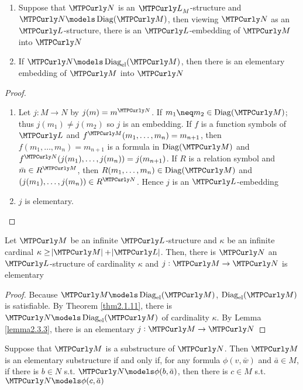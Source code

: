 \documentclass[11pt]{article}
\begin{document}
\begin{lemma}[]
\label{lemma2.3.3}
\begin{enumerate}
\item Suppose that \(\caln\) is an \(\call_M\)-structure and
\(\caln\models\Diag(\calm)\), then viewing \(\caln\) as an
\(\call\)-structure, there is an \(\call\)-embedding of \(\calm\) into \(\caln\)
\item If \(\caln\models\Diag_{\el}(\calm)\), then there is an elementary
embedding of \(\calm\) into \(\caln\)
\end{enumerate}
\end{lemma}

\begin{proof}
\begin{enumerate}
\item Let \(j:M\to N\) by \(j(m)=m^\caln\). If \(m_1\neq m_2\in\Diag(\calm)\);
thus \(j(m_1)\neq j(m_2)\) so \(j\) is an embedding. If \(f\) is a function
symbols of \(\call\) and \(f^\calm(m_1,\dots,m_n)=m_{n+1}\), then
\(f(m_1,\dots,m_n)=m_{n+1}\) is a formula in \(\Diag(\calm)\) and 
\(f^\caln(j(m_1),\dots,j(m_n))=j(m_{n+1})\). If \(R\) is a relation symbol
and \(\bar{m}\in R^\calm\), then \(R(m_1,\dots,m_n)\in\Diag(\calm)\) and 
\((j(m_1),\dots,j(m_{n}))\in R^\caln\). Hence \(j\) is an
\(\call\)-embedding
\item \(j\) is elementary.
\end{enumerate}
\end{proof}

\begin{theorem}
Let \(\calm\) be an infinite \(\call\)-structure and \(\kappa\) be an infinite
cardinal \(\kappa\ge\abs{\calm}+\abs{\call}\). Then, there is \(\caln\) an
\(\call\)-structure of cardinality \(\kappa\) and \(j:\calm\to\caln\) is elementary
\end{theorem}

\begin{proof}
Because \(\calm\models\Diag_{\el}(\calm)\), \(\Diag_{\el}(\calm)\) is
satisfiable. By Theorem \ref{thm2.1.11}, there is
\(\caln\models\Diag_{\el}(\calm)\) of cardinality \(\kappa\). By Lemma \ref{lemma2.3.3},
there is an elementary \(j:\calm\to\caln\)
\end{proof}

\begin{proposition}
\label{prop2.3.5}
Suppose that \(\calm\) is a substructure of \(\caln\). Then \(\calm\) is an
elementary substructure if and only if, for any formula \(\phi(v,\bar{w})\) and 
\(\bar{a}\in M\), if there is \(b\in N\) s.t.
\(\caln\models\phi(b,\bar{a})\), then there is \(c\in M\) s.t.
\(\caln\models\phi(c,\bar{a})\) 
\end{proposition}
\end{document}
